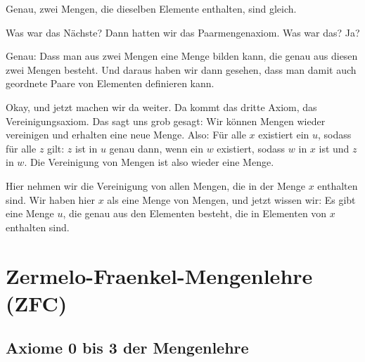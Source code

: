 \begin{spoken-clean}[continued]
Genau, zwei Mengen, die dieselben Elemente enthalten, sind gleich.
\end{spoken-clean}

\begin{spoken-clean}[00:12:15 - 00:15:06]
Was war das Nächste? Dann hatten wir das Paarmengenaxiom. Was war das? Ja?

Genau: Dass man aus zwei Mengen eine Menge bilden kann, die genau aus diesen zwei Mengen besteht. Und daraus haben wir dann gesehen, dass man damit auch geordnete Paare von Elementen definieren kann.

Okay, und jetzt machen wir da weiter. Da kommt das dritte Axiom, das Vereinigungsaxiom. Das sagt uns grob gesagt: Wir können Mengen wieder vereinigen und erhalten eine neue Menge. Also: Für alle $x$ existiert ein $u$, sodass für alle $z$ gilt: $z$ ist in $u$ genau dann, wenn ein $w$ existiert, sodass $w$ in $x$ ist und $z$ in $w$. Die Vereinigung von Mengen ist also wieder eine Menge.

Hier nehmen wir die Vereinigung von allen Mengen, die in der Menge $x$ enthalten sind. Wir haben hier $x$ als eine Menge von Mengen, und jetzt wissen wir: Es gibt eine Menge $u$, die genau aus den Elementen besteht, die in Elementen von $x$ enthalten sind.
\end{spoken-clean}

\section{Zermelo-Fraenkel-Mengenlehre (ZFC)}

\subsection{Axiome 0 bis 3 der Mengenlehre}

